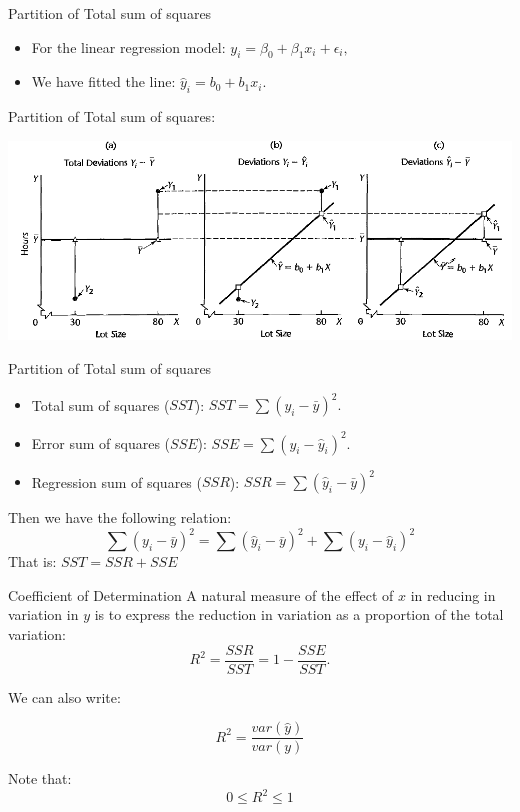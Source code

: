 \documentclass[
  ignorenonframetext,
]{beamer}
\begin{document}
\begin{frame}{Partition of Total sum of squares}
\protect\hypertarget{partition-of-total-sum-of-squares}{}
\begin{itemize}
\item
  For the linear regression model:
  \(y_i=\beta_0+\beta_1x_i+\epsilon_i,\)
\item
  We have fitted the line: \(\hat{y}_i=b_0+b_1x_i.\)
\end{itemize}

Partition of Total sum of squares:

\begin{center}\includegraphics[width=0.65\linewidth]{week2_5} \end{center}
\end{frame}

\begin{frame}{Partition of Total sum of squares}
\protect\hypertarget{partition-of-total-sum-of-squares-1}{}
\begin{itemize}
\item
  Total sum of squares (\(SST\)): \(SST=\sum(y_i-\bar{y})^2.\)
\item
  Error sum of squares (\(SSE\)): \(SSE=\sum (y_i-\hat{y}_i)^2.\)
\item
  Regression sum of squares (\(SSR\)):
  \(SSR=\sum (\hat{y}_i-\bar{y})^2\)
\end{itemize}

Then we have the following relation:
\[\sum(y_i-\bar{y})^2=\sum (\hat{y}_i-\bar{y})^2+\sum (y_i-\hat{y}_i)^2\]
That is: \(SST=SSR+SSE\)
\end{frame}

\begin{frame}{Coefficient of Determination}
\protect\hypertarget{coefficient-of-determination}{}
A natural measure of the effect of \(x\) in reducing in variation in
\(y\) is to express the reduction in variation as a proportion of the
total variation: \[R^2=\frac{SSR}{SST}=1-\frac{SSE}{SST}.\]

We can also write:

\[R^2=\frac{var(\hat{y})}{var(y)}\]

Note that: \[0\leq R^2 \leq 1\]
\end{frame}
\end{document}
